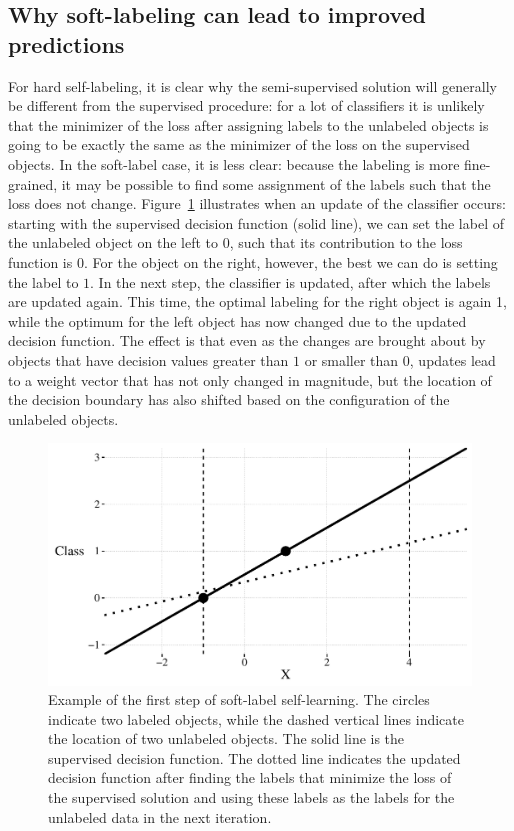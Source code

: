 \documentclass[conference,a4paper,10pt]{IEEEtran}\usepackage[]{graphicx}\usepackage[]{color}
\makeatletter
\def\maxwidth{ %
  \ifdim\Gin@nat@width>\linewidth
    \linewidth
  \else
    \Gin@nat@width
  \fi
}
\newenvironment{knitrout}{}{} %
\makeatother
\begin{document}
\subsection{Why soft-labeling can lead to improved predictions}
For hard self-labeling, it is clear why the semi-supervised solution will generally be different from the supervised procedure: for a lot of classifiers it is unlikely that the minimizer of the loss after assigning labels to the unlabeled objects is going to be exactly the same as the minimizer of the loss on the supervised objects. In the soft-label case, it is less clear: because the labeling is more fine-grained, it may be possible to find some assignment of the labels such that the loss does not change. Figure~\ref{fig:simple-example} illustrates when an update of the classifier occurs: starting with the supervised decision function (solid line), we can set the label of the unlabeled object on the left to $0$, such that its contribution to the loss function is $0$. For the object on the right, however, the best we can do is setting the label to $1$. In the next step, the classifier is updated, after which the labels are updated again. This time, the optimal labeling for the right object is again 1, while the optimum for the left object has now changed due to the updated decision function. The effect is that even as the changes are brought about by objects that have decision values greater than $1$ or smaller than $0$, updates lead to a weight vector that has not only changed in magnitude, but the location of the decision boundary has also shifted based on the configuration of the unlabeled objects.

\begin{knitrout}
\color{fgcolor}\begin{figure}
\includegraphics[width=\maxwidth]{figure/simple-example-1} \caption[Example of the first step of soft-label self-learning]{Example of the first step of soft-label self-learning. The circles indicate two labeled objects, while the dashed vertical lines indicate the location of two unlabeled objects. The solid line is the supervised decision function. The dotted line indicates the updated decision function after finding the labels that minimize the loss of the supervised solution and using these labels as the labels for the unlabeled data in the next iteration.}\label{fig:simple-example}
\end{figure}


\end{knitrout}
 
\end{document}
